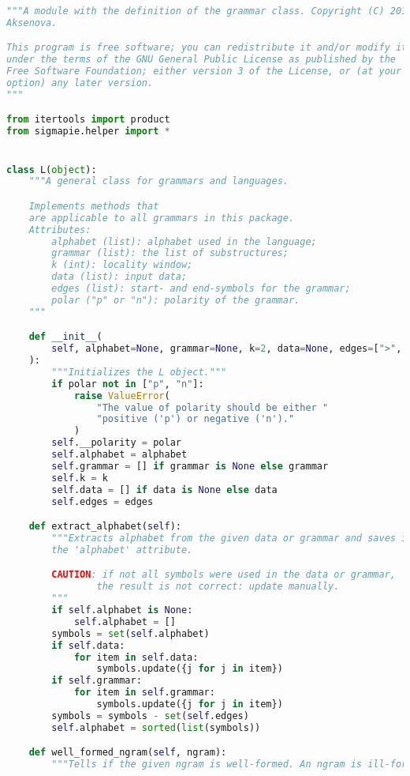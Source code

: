 \begin{lstlisting}[language=Python]
"""A module with the definition of the grammar class. Copyright (C) 2019  Alena
Aksenova.

This program is free software; you can redistribute it and/or modify it
under the terms of the GNU General Public License as published by the
Free Software Foundation; either version 3 of the License, or (at your
option) any later version.
"""

from itertools import product
from sigmapie.helper import *


class L(object):
    """A general class for grammars and languages.

    Implements methods that
    are applicable to all grammars in this package.
    Attributes:
        alphabet (list): alphabet used in the language;
        grammar (list): the list of substructures;
        k (int): locality window;
        data (list): input data;
        edges (list): start- and end-symbols for the grammar;
        polar ("p" or "n"): polarity of the grammar.
    """

    def __init__(
        self, alphabet=None, grammar=None, k=2, data=None, edges=[">", "<"], polar="p"
    ):
        """Initializes the L object."""
        if polar not in ["p", "n"]:
            raise ValueError(
                "The value of polarity should be either "
                "positive ('p') or negative ('n')."
            )
        self.__polarity = polar
        self.alphabet = alphabet
        self.grammar = [] if grammar is None else grammar
        self.k = k
        self.data = [] if data is None else data
        self.edges = edges

    def extract_alphabet(self):
        """Extracts alphabet from the given data or grammar and saves it into
        the 'alphabet' attribute.

        CAUTION: if not all symbols were used in the data or grammar,
                the result is not correct: update manually.
        """
        if self.alphabet is None:
            self.alphabet = []
        symbols = set(self.alphabet)
        if self.data:
            for item in self.data:
                symbols.update({j for j in item})
        if self.grammar:
            for item in self.grammar:
                symbols.update({j for j in item})
        symbols = symbols - set(self.edges)
        self.alphabet = sorted(list(symbols))

    def well_formed_ngram(self, ngram):
        """Tells if the given ngram is well-formed. An ngram is ill-formed if:


\end{lstlisting}
